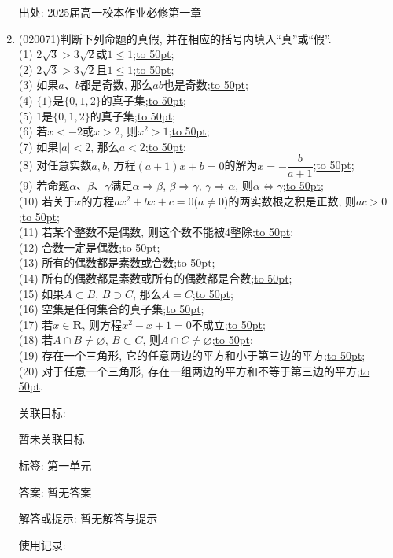 \documentclass[10pt,a4paper]{article}
\newcommand{\blank}[1]{\underline{\hbox to #1pt{}}}
\begin{document}
\begin{enumerate}[1.]
出处: 2025届高一校本作业必修第一章
\item { (020071)}判断下列命题的真假, 并在相应的括号内填入``真''或``假''.\\
(1) $2\sqrt 3>3\sqrt 2$或$1\le 1$;\blank{50};\\
(2) $2\sqrt 3>3\sqrt 2$且$1\le1$;\blank{50};\\
(3) 如果$a$、$b$都是奇数, 那么$ab$也是奇数;\blank{50};\\
(4) $\{1\}$是$\{0, 1, 2\}$的真子集;\blank{50};\\
(5) $1$是$\{0, 1, 2\}$的真子集;\blank{50};\\
(6) 若$x<-2$或$x>2$, 则$x^2>1$;\blank{50};\\
(7) 如果$|a|<2$, 那么$a<2$;\blank{50};\\
(8) 对任意实数$a,b$, 方程$(a+1)x+b=0$的解为$x=-\dfrac b{a+1}$;\blank{50};\\
(9) 若命题$\alpha$、$\beta$、$\gamma$满足$\alpha\Rightarrow \beta$, $\beta\Rightarrow \gamma$, $\gamma\Rightarrow \alpha$, 则$\alpha\Leftrightarrow \gamma$;\blank{50};\\
(10) 若关于$x$的方程$ax^2+bx+c=0$($a\ne 0$)的两实数根之积是正数, 则$ac>0$;\blank{50};\\
(11) 若某个整数不是偶数, 则这个数不能被$4$整除;\blank{50};\\
(12) 合数一定是偶数;\blank{50};\\
(13) 所有的偶数都是素数或合数;\blank{50};\\
(14) 所有的偶数都是素数或所有的偶数都是合数;\blank{50};\\
(15) 如果$A\subset B$, $B\supset C$, 那么$A=C$;\blank{50};\\
(16) 空集是任何集合的真子集;\blank{50};\\
(17) 若$x\in \mathbf{R}$, 则方程$x^2-x+1=0$不成立;\blank{50};\\
(18) 若$A\cap B\ne \varnothing$, $B\subset C$, 则$A\cap C\ne \varnothing$;\blank{50};\\
(19) 存在一个三角形, 它的任意两边的平方和小于第三边的平方;\blank{50};\\
(20) 对于任意一个三角形, 存在一组两边的平方和不等于第三边的平方;\blank{50}.


关联目标:

暂未关联目标



标签: 第一单元

答案: 暂无答案

解答或提示: 暂无解答与提示

使用记录:


\end{enumerate}
\end{document}
